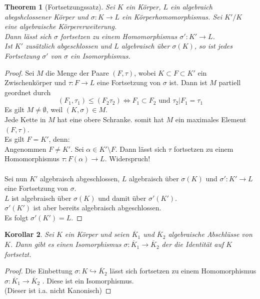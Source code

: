 \documentclass[10pt,a4paper]{article}
\newcommand{\al}{\ensuremath{\alpha}}
\newcommand{\ol}[1]{\overline{#1}}
\theoremstyle{plain}
\newtheorem{theorem}{Theorem}[section]
\newtheorem{kor}[theorem]{Korollar}
\theoremstyle{definition}
\theoremstyle{remark}
\begin{document}
	 \begin{theorem}[Fortsetzungssatz]\label{satz:Fortsetzung}
	 	Sei $K$ ein Körper, $L$ ein algebraich abegshclossener Körper und $\sigma:K\to L$ ein Körperhomomorphismus. Sei $K'/K$ eine algebraische Körpererweiterung.\\
	 	Dann lässt sich $\sigma$ fortsetzen zu einem Homomorphismus $\sigma':K'\to L$.\\
	 	Ist $K'$ zusätzlich abgeschlossen und $L$ algebraisch über $\sigma(K)$, so ist jedes Fortsetzung $\sigma'$ von $\sigma$ ein Isomorphismus.
	 \end{theorem}
 	\begin{proof}
 		Sei $M$ die Menge der Paare $(F,\tau)$, wobei $K\subset F\subset K'$ ein Zwischenkörper und $\tau:F\to L$ eine Fortsetzung von $\sigma$ ist. Dann ist $M$ partiell geordnet durch
 		\[(F_1,\tau_1)\leq (F_2\tau_2)\Leftrightarrow F_1\subset F_2\text{ und }\tau_2|F_1=\tau_1\]
 		Es gilt $M\neq\emptyset$, weil $(K,\sigma)\in M$.\\
 		Jede Kette in $M$ hat eine obere Schranke. somit hat $M$ ein maximales Element $(F,\tau)$. \\
 		Es gilt $F=K'$, denn:\\
 		Angenommen $F\neq K'$. Sei $\al\in K'\setminus F$. Dann lässt sich $\tau$ fortsetzen zu einem Homomorphismus $\tau:F(\al)\to L$. Widerspruch!\\
 		\\
 		Sei nun $K'$ algebraisch abgeschlossen, $L$ algebraisch über $\sigma(K)$ und $\sigma':K'\to L$ eine Fortsetzung von $\sigma$.\\
 		$L$ ist algebraisch über $\sigma(K)$ und damit über  $\sigma'(K')$.\\
 		$\sigma'(K')$ ist aber bereits algebraisch abgeschlossen.\\
 		Es folgt $\sigma'(K')=L$.
 	\end{proof}
 
 	\begin{kor}
 		Sei $K$ ein Körper und seien $\ol K_1$ und $\ol K_2$ algebraische Abschlüsse von $K$. Dann gibt es einen Isomorphismus $\sigma:\ol K_1\to \ol K_2$ der die Identität auf $K$ fortsetzt.
 	\end{kor}
 	\begin{proof}
 		Die Einbettung $\sigma:K\hookrightarrow \ol K_2$ lässt sich fortsetzen zu einem Homomorphismus $\sigma:\ol K_1\to\ol K_2$ . Diese ist ein Isomorphismus.\\
 		(Dieser ist i.a. nicht Kanonisch)
 	\end{proof}
 
\end{document}
